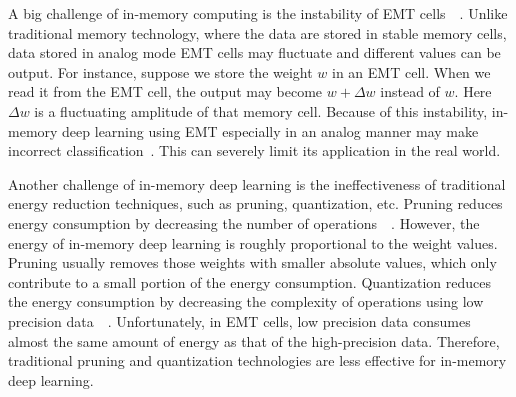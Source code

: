 \documentclass[10pt,journal,compsoc]{IEEEtran}
\begin{document}
A big challenge of in-memory computing is the instability of EMT cells~\cite{raghavan2013rtn}~\cite{luo2018fpga}. Unlike traditional memory technology, where the data are stored in stable memory cells, data stored in analog mode EMT cells may fluctuate and different values can be output. For instance, suppose we store the weight $w$ in an EMT cell. When we read it from the EMT cell, the output may become $w+\Delta w$ instead of $w$. Here $\Delta w$ is a fluctuating amplitude of that memory cell. Because of this instability, in-memory deep learning using EMT especially in an analog manner may make incorrect classification~\cite{du2020exploring}. This can severely limit its application in the real world.

Another challenge of in-memory deep learning is the ineffectiveness of traditional energy reduction techniques, such as pruning, quantization, etc. Pruning reduces energy consumption by decreasing the number of operations~\cite{yang2017designing}~\cite{DeepCompression}. However, the energy of in-memory deep learning is roughly proportional to the weight values. Pruning usually removes those weights with smaller absolute values, which only contribute to a small portion of the energy consumption. Quantization reduces the energy consumption by decreasing the complexity of operations using low precision data~\cite{wang2019haq}~\cite{wang2021evolutionary}. Unfortunately, in EMT cells, low precision data consumes almost the same amount of energy as that of the high-precision data. Therefore, traditional pruning and quantization technologies are less effective for in-memory deep learning.
\end{document}
